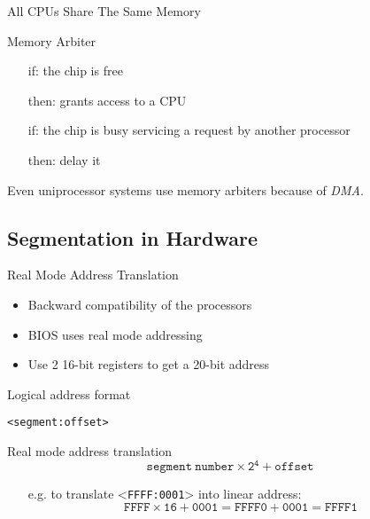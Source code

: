 \begin{frame}[plain]
  \begin{center}
  \end{center}
\end{frame}

\begin{frame}{All CPUs Share The Same Memory}
  \begin{block}{Memory Arbiter}
    \begin{itemize}
    \item[if:] the chip is free
    \item[then:] grants access to a CPU
    \item[if:] the chip is busy servicing a request by another processor
    \item[then:] delay it
    \end{itemize}    
  \end{block}
  Even uniprocessor systems use memory arbiters because of \emph{DMA}.
\end{frame}

\subsection{Segmentation in Hardware}

\begin{frame}{Real Mode Address Translation}
  \begin{itemize}
  \item Backward compatibility of the processors
  \item BIOS uses real mode addressing
  \item Use 2 16-bit registers to get a 20-bit address
  \end{itemize}

  \begin{block}{Logical address format}
    \begin{center}
      \texttt{<segment:offset>}
    \end{center}
  \end{block}

  \begin{block}{Real mode address translation}
    $$\mathtt{segment\ number\times{}2^4+offset}$$
    \begin{itemize}
    \item[e.g.] to translate <\texttt{FFFF:0001}> into linear address:
      $$\mathtt{FFFF \times{} 16 + 0001 = FFFF0 + 0001 = FFFF1}$$
    \end{itemize}
  \end{block}
\end{frame}

